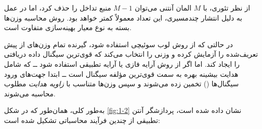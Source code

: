 \begin{itemize}
	از نظر تئوری، با $M$ المان آنتنی می‌توان $M-1$ منبع تداخل را حذف کرد، اما در عمل به دلیل انتشار چندمسیری، این تعداد معمولاً کمتر خواهد بود. روش محاسبه وزن‌ها بسته به نوع معیار بهینه‌سازی متفاوت است.
	
	در حالتی که از روش لوب سوئیچی استفاده شود، گیرنده تمام وزن‌های از پیش تعریف‌شده را آزمایش کرده و وزنی را انتخاب می‌کند که قوی‌ترین سیگنال داده دریافتی را ایجاد کند. اما اگر از روش آرایه فازی یا آرایه تطبیقی استفاده شود ــ که شامل هدایت بیشینه بهره به سمت قوی‌ترین مؤلفه سیگنال است ــ ابتدا جهت‌های ورود سیگنال‌ها () تخمین زده می‌شوند و سپس وزن‌ها متناسب با\textit{ زاویه هدایت} مطلوب محاسبه می‌شوند.
	
\end{itemize}
به‌طور کلی، همان‌طور که در شکل \ref{fig:1-2} نشان داده شده است، پردازشگر آنتن تطبیقی از چندین فرآیند محاسباتی تشکیل شده است:

